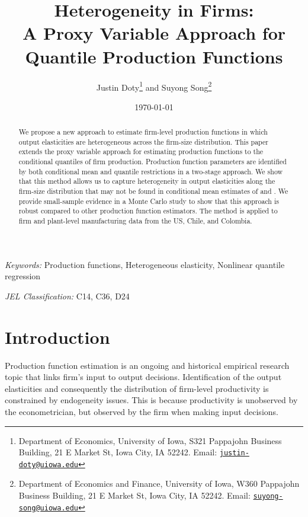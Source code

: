 \documentclass[11pt]{article}
\begin{document}
\title{Heterogeneity in Firms: \\
A Proxy Variable Approach for Quantile Production Functions
}

\author{Justin Doty\thanks{Department of Economics, University of Iowa, S321 Pappajohn Business Building, 21 E Market St, Iowa City, IA 52242. Email: \href{mailto:justin-doty@uiowa.edu}{\texttt{justin-doty@uiowa.edu}}} and Suyong Song\thanks{Department of Economics and Finance, University of Iowa, W360 Pappajohn Business Building, 21 E Market St, Iowa City, IA 52242. Email: \href{mailto:suyong-song@uiowa.edu}{\texttt{suyong-song@uiowa.edu}}}
}

\date {\today}
\maketitle


\begin{abstract}
We propose a new approach to estimate firm-level production functions in which output elasticities are heterogeneous across the firm-size distribution. 
This paper extends the proxy variable approach for estimating production functions to the conditional quantiles of firm production. Production function parameters are identified by both conditional mean and quantile restrictions in a two-stage approach. We show that this method allows us to capture heterogeneity in output elasticities along the firm-size distribution that may not be found in conditional mean estimates of \cite{Olley1996} and \cite{Levinsohn2003}. We provide small-sample evidence in a Monte Carlo study to show that this approach is robust compared to other production function estimators. The method is applied to firm and plant-level manufacturing data from the US, Chile, and Colombia.
\end{abstract}


\textit{Keywords:} Production functions, Heterogeneous elasticity, Nonlinear quantile regression

\textit{JEL Classification:} C14, C36, D24



\baselineskip25pt

\onehalfspacing

\section{Introduction}

Production function estimation is an ongoing and historical empirical research topic that links firm's input to output decisions. Identification of the output elasticities and consequently the distribution of firm-level productivity is constrained by endogeneity issues. This is because productivity is unobserved by the econometrician, but observed by the firm when making input decisions. 
\end{document}
